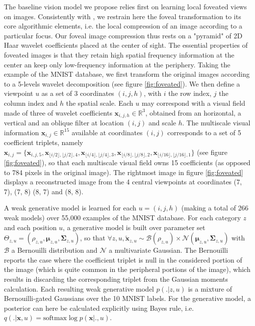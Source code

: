 \documentclass{article} %
\begin{document}
The baseline vision model we propose relies first on learning local foveated views on images. %
Consistently with \cite{kortum1996implementation,wang2003foveation}, we restrain here the foveal transformation to its core algorithmic elements, i.e. the local compression of an image according to a particular focus. Our foveal image compression thus rests on a "pyramid" of 2D Haar wavelet coefficients placed at the center of sight. The essential properties of foveated images is that they retain high spatial frequency information at the center an keep only low-frequency information at the periphery.  Taking the example of the MNIST database, we first transform the original images according to a 5-levels wavelet decomposition (see figure \ref{fig:foveated}). We then define a viewpoint $u$ as a set of 3 coordinates $(i,j,h)$, with $i$ the row index, $j$ the column index and $h$ the spatial scale. Each $u$ may correspond with a visual field made of three of wavelet coefficients $\boldsymbol{x}_{i,j,h} \in \mathbb{R}^3$, obtained from an horizontal, a vertical and an oblique filter at location $(i,j)$ and scale $h$.  The multiscale visual information $\boldsymbol{x}_{i,j} \in \mathbb{R}^{15}$ available at coordinates $(i,j)$ corresponds to a set of 5 coefficient triplets, namely $\boldsymbol{x}_{i,j}=\{\boldsymbol{x}_{i,j,5}, \boldsymbol{x}_{\lfloor i/2\rfloor,\lfloor j/2\rfloor,4}, \boldsymbol{x}_{\lfloor i/4\rfloor,\lfloor j/4\rfloor,3}, \boldsymbol{x}_{\lfloor i/8\rfloor,\lfloor j/8\rfloor, 2}, \boldsymbol{x}_{\lfloor i/16\rfloor,\lfloor j/16\rfloor, 1}\}$ (see figure \ref{fig:foveated}), so that each multiscale visual field owns 15 coefficients (as opposed to 784 pixels in the original image).
The rightmost image in figure \ref{fig:foveated} displays a reconstructed image from the 4 central viewpoints at coordinates (7, 7), (7, 8) (8, 7) and (8, 8).

A weak generative model is learned for each $u = (i,j,h)$ (making a total of 266 weak models) over 55,000 examples of the MNIST database. For each category $z$ and each position $u$, a generative model is built over parameter set $\Theta_{z,u} = (\rho_{z,u}, \boldsymbol{\mu}_{z,u}, \boldsymbol{\Sigma}_{z,u})$, so that $\forall z,u, \tilde{\boldsymbol{x}}_{z,u} \sim \mathcal{B}(\rho_{z,u}) \times \mathcal{N}(\boldsymbol{\mu}_{z,u}, \boldsymbol{\Sigma}_{z,u})$ with $\mathcal{B}$ a Bernouilli distribution and $\mathcal{N}$ a multivariate Gaussian. The Bernouilli reports the case where the coefficient triplet is null in the considered portion of the image (which is quite common in the peripheral portions of the image), which results in discarding the corresponding triplet from the Gaussian moments calculation. Each resulting weak generative model $p(.|z,u)$ is a mixture of Bernouilli-gated Gaussians over the 10 MNIST labels. For the generative model, a posterior can here be calculated explicitly using Bayes rule, i.e. $q(.|\boldsymbol{x},u) = \text{softmax} \log p(\boldsymbol{x}|.,u)$.
\end{document}
